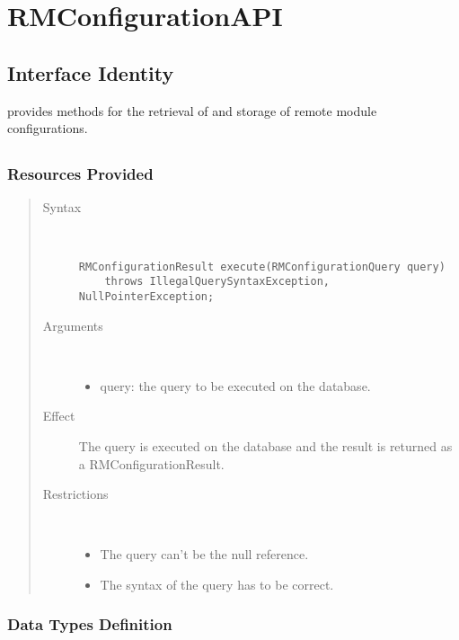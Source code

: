 \section{RMConfigurationAPI}
\label{api:rm-configuration-api}

\subsection{Interface Identity}

\npar {} provides methods for the retrieval of and
storage of remote module configurations.

\subsection{}

\subsubsection{Resources Provided}

\begin{quote}
	\begin{description}
		\item[Syntax] \
		\begin{verbatim}
RMConfigurationResult execute(RMConfigurationQuery query)
    throws IllegalQuerySyntaxException, NullPointerException;
		\end{verbatim}
		\item[Arguments] \
		\begin{itemize}
		  \item query: the query to be executed on the database. 
		\end{itemize}
		\item[Effect] The query is executed on the database and the result is returned
		as a RMConfigurationResult. 
		\item[Restrictions] \
		\begin{itemize}
		  \item The query can't be the null reference.
		  \item The syntax of the query has to be correct.
		\end{itemize}
	\end{description} 
\end{quote}

\subsubsection{Data Types Definition}

